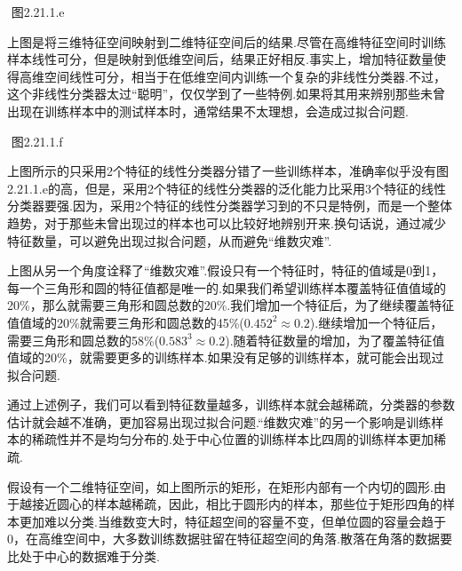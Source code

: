 ​ 图2.21.1.e

​
上图是将三维特征空间映射到二维特征空间后的结果.尽管在高维特征空间时训练样本线性可分，但是映射到低维空间后，结果正好相反.事实上，增加特征数量使得高维空间线性可分，相当于在低维空间内训练一个复杂的非线性分类器.不过，这个非线性分类器太过``聪明''，仅仅学到了一些特例.如果将其用来辨别那些未曾出现在训练样本中的测试样本时，通常结果不太理想，会造成过拟合问题.

 

​ 图2.21.1.f

​
上图所示的只采用2个特征的线性分类器分错了一些训练样本，准确率似乎没有图2.21.1.e的高，但是，采用2个特征的线性分类器的泛化能力比采用3个特征的线性分类器要强.因为，采用2个特征的线性分类器学习到的不只是特例，而是一个整体趋势，对于那些未曾出现过的样本也可以比较好地辨别开来.换句话说，通过减少特征数量，可以避免出现过拟合问题，从而避免``维数灾难''.

 

​
上图从另一个角度诠释了``维数灾难''.假设只有一个特征时，特征的值域是0到1，每一个三角形和圆的特征值都是唯一的.如果我们希望训练样本覆盖特征值值域的20\%，那么就需要三角形和圆总数的20\%.我们增加一个特征后，为了继续覆盖特征值值域的20\%就需要三角形和圆总数的45\%($0.452^2\approx0.2$).继续增加一个特征后，需要三角形和圆总数的58\%($0.583^3\approx0.2$).随着特征数量的增加，为了覆盖特征值值域的20\%，就需要更多的训练样本.如果没有足够的训练样本，就可能会出现过拟合问题.

​
通过上述例子，我们可以看到特征数量越多，训练样本就会越稀疏，分类器的参数估计就会越不准确，更加容易出现过拟合问题.``维数灾难''的另一个影响是训练样本的稀疏性并不是均匀分布的.处于中心位置的训练样本比四周的训练样本更加稀疏.

 

​
假设有一个二维特征空间，如上图所示的矩形，在矩形内部有一个内切的圆形.由于越接近圆心的样本越稀疏，因此，相比于圆形内的样本，那些位于矩形四角的样本更加难以分类.当维数变大时，特征超空间的容量不变，但单位圆的容量会趋于0，在高维空间中，大多数训练数据驻留在特征超空间的角落.散落在角落的数据要比处于中心的数据难于分类.

